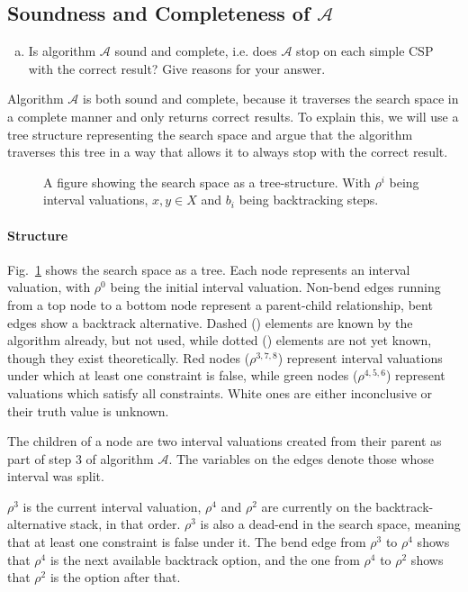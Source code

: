 \subsection{Soundness and Completeness of $\mathcal{A}$}
\begin{enumerate}[(b)]
\item Is algorithm $\mathcal{A}$ sound and complete, i.e. does $\mathcal{A}$ stop on each simple CSP with the correct result? Give reasons for your answer.
\end{enumerate}

Algorithm $\mathcal{A}$ is both sound and complete, because it traverses the search space in a complete manner and only returns correct results.
To explain this, we will use a tree structure representing the search space and argue that the algorithm traverses this tree in a way that allows it to always stop with the correct result.

\begin{figure}[H]
    \centering
    
    \caption{
        A figure showing the search space as a tree-structure.
        With $\rho^i$ being interval valuations, $x, y \in X$ and $b_i$ being backtracking steps.
    }
    \label{fig:search-tree}
\end{figure}


\paragraph{Structure}
Fig.~\ref{fig:search-tree} shows the search space as a tree.
Each node represents an interval valuation, with $\rho^0$ being the initial interval valuation.
Non-bend edges running from a top node to a bottom node represent a parent-child relationship, bent edges show a backtrack alternative.
Dashed (\dashed) elements are known by the algorithm already, but not used, while dotted (\dotted) elements are not yet known, though they exist theoretically.
Red nodes ($\rho^{3,7,8}$) represent interval valuations under which at least one constraint is false, while green nodes ($\rho^{4,5,6}$) represent valuations which satisfy all constraints.
White ones are either inconclusive or their truth value is unknown.

The children of a node are two interval valuations created from their parent as part of step 3 of algorithm $\mathcal{A}$.
The variables on the edges denote those whose interval was split.

$\rho^3$ is the current interval valuation, $\rho^4$ and $\rho^2$ are currently on the backtrack-alternative stack, in that order.
$\rho^3$ is also a dead-end in the search space, meaning that at least one constraint is false under it.
The bend edge from $\rho^3$ to $\rho^4$ shows that $\rho^4$ is the next available backtrack option, and the one from $\rho^4$ to $\rho^2$ shows that $\rho^2$ is the option after that.

